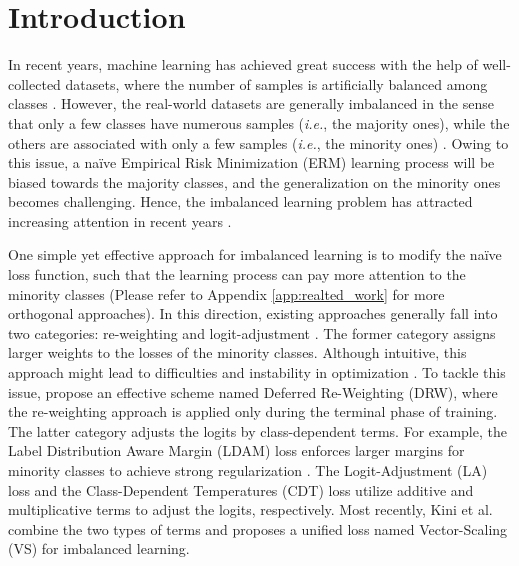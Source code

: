 \section{Introduction}
In recent years, machine learning has achieved great success with the help of well-collected datasets, where the number of samples is artificially balanced among classes \cite{krizhevsky2009learning,DBLP:journals/ijcv/RussakovskyDSKS15}. However, the real-world datasets are generally imbalanced in the sense that only a few classes have numerous samples (\textit{i.e.}, the majority ones), while the others are associated with only a few samples (\textit{i.e.}, the minority ones) \cite{DBLP:journals/ijcv/EveringhamGWWZ10,DBLP:conf/eccv/LinMBHPRDZ14,DBLP:conf/cvpr/HornASCSSAPB18}. Owing to this issue, a na\"ive Empirical Risk Minimization (ERM) learning process will be biased towards the majority classes, and the generalization on the minority ones becomes challenging. Hence, the imbalanced learning problem has attracted increasing attention in recent years \cite{DBLP:journals/tkde/HeG09,DBLP:journals/corr/abs-1709-01450,DBLP:journals/pami/OksuzCKA21,DBLP:journals/corr/abs-2110-04596}.

One simple yet effective approach for imbalanced learning is to modify the na\"ive loss function, such that the learning process can pay more attention to the minority classes (Please refer to Appendix \ref{app:realted_work} for more orthogonal approaches). In this direction, existing approaches generally fall into two categories: re-weighting \cite{DBLP:conf/icml/MorikBJ99,DBLP:conf/cvpr/CuiJLSB19} and logit-adjustment \cite{DBLP:conf/nips/CaoWGAM19,DBLP:conf/iclr/MenonJRJVK21,DBLP:journals/corr/abs-2001-01385,DBLP:conf/cvpr/TanWLLOYY20,DBLP:conf/nips/KiniPOT21}. The former category assigns larger weights to the losses of the minority classes. Although intuitive, this approach might lead to difficulties and instability in optimization \cite{DBLP:conf/cvpr/CuiJLSB19,DBLP:conf/nips/CaoWGAM19,DBLP:conf/cvpr/HuangLLT16}. To tackle this issue, \citet{DBLP:conf/nips/CaoWGAM19} propose an effective scheme named Deferred Re-Weighting (DRW), where the re-weighting approach is applied only during the terminal phase of training. The latter category adjusts the logits by class-dependent terms. For example, the Label Distribution Aware Margin (LDAM) loss enforces larger margins for minority classes to achieve strong regularization \cite{DBLP:conf/nips/CaoWGAM19}. The Logit-Adjustment (LA) loss \cite{DBLP:conf/iclr/MenonJRJVK21} and the Class-Dependent Temperatures (CDT) loss \cite{DBLP:journals/corr/abs-2001-01385} utilize additive and multiplicative terms to adjust the logits, respectively. Most recently, Kini et al. \cite{DBLP:conf/nips/KiniPOT21} combine the two types of terms and proposes a unified loss named Vector-Scaling (VS) for imbalanced learning.

